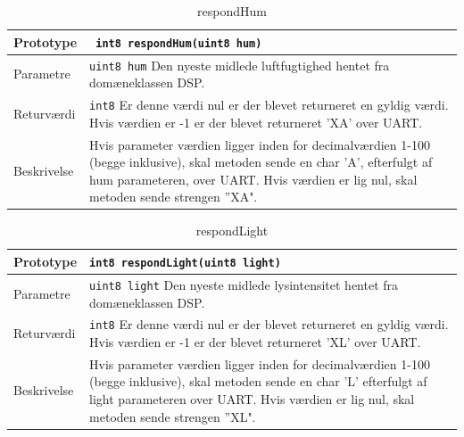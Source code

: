 
\begin{table}[h]
\begin{tabularx}{\textwidth}{| >{\raggedright\arraybackslash}p{2.5 cm} | >{\raggedright\arraybackslash}X |} \hline
Prototype & \texttt{ int8 respondHum(uint8 hum)} \\\hline
Parametre & \texttt{uint8 hum} \newline
Den nyeste midlede luftfugtighed hentet fra domæneklassen DSP. 
 \\\hline
Returværdi & \texttt{int8} \newline
Er denne værdi nul er der blevet returneret en gyldig værdi. Hvis værdien er -1 er der blevet returneret ’XA’ over UART. \\\hline
Beskrivelse & Hvis parameter værdien ligger inden for decimalværdien 1-100 (begge inklusive), skal metoden sende en char ’A’, efterfulgt af hum parameteren, over UART. Hvis værdien er lig nul, skal metoden sende strengen ”XA".    \\\hline
\end{tabularx}
\caption{respondHum}
\label{table:respondHum}
\end{table}


\begin{table}[h]
\begin{tabularx}{\textwidth}{| >{\raggedright\arraybackslash}p{2.5 cm} | >{\raggedright\arraybackslash}X |} \hline
Prototype & \texttt{int8 respondLight(uint8 light)} \\\hline
Parametre & \texttt{uint8 light} \newline
Den nyeste midlede lysintensitet hentet fra domæneklassen DSP. 
 \\\hline
Returværdi & \texttt{int8} \newline
Er denne værdi nul er der blevet returneret en gyldig værdi. Hvis værdien er -1 er der blevet returneret ’XL’ over UART.\\\hline
Beskrivelse & Hvis parameter værdien ligger inden for decimalværdien 1-100 (begge inklusive), skal metoden sende en char ’L’ efterfulgt af light parameteren over UART. Hvis værdien er lig nul, skal metoden sende strengen ”XL".     \\\hline
\end{tabularx}
\caption{respondLight}
\label{table:respondLight}
\end{table}

